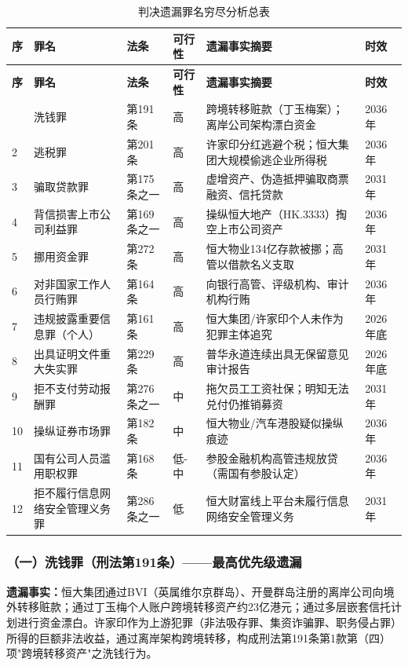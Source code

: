 \documentclass[11pt,a4paper,oneside,openany]{article}
\begin{document}
\begin{longtable}{p{0.4cm}p{2.5cm}p{1.4cm}p{1.1cm}p{5.2cm}p{1.5cm}}
\caption{判决遗漏罪名穷尽分析总表}\label{tab:omitted}\\
\toprule
\textbf{序} & \textbf{罪名} & \textbf{法条} & \textbf{可行性} & \textbf{遗漏事实摘要} & \textbf{时效} \\
\midrule
\endfirsthead
\toprule
\textbf{序} & \textbf{罪名} & \textbf{法条} & \textbf{可行性} & \textbf{遗漏事实摘要} & \textbf{时效} \\
\midrule
\endhead
\bottomrule
\endlastfoot
1 & 洗钱罪 & 第191条 & \cellcolor{rowalt}高 & 跨境转移赃款（丁玉梅案）；离岸公司架构漂白资金 & 2036年 \\
2 & 逃税罪 & 第201条 & \cellcolor{rowalt}高 & 许家印分红逃避个税；恒大集团大规模偷逃企业所得税 & 2036年 \\
3 & 骗取贷款罪 & 第175条之一 & \cellcolor{rowalt}高 & 虚增资产、伪造抵押骗取商票融资、信托贷款 & 2031年 \\
4 & 背信损害上市公司利益罪 & 第169条之一 & \cellcolor{rowalt}高 & 操纵恒大地产（HK.3333）掏空上市公司资产 & 2036年 \\
5 & 挪用资金罪 & 第272条 & \cellcolor{rowalt}高 & 恒大物业134亿存款被挪；高管以借款名义支取 & 2031年 \\
6 & 对非国家工作人员行贿罪 & 第164条 & \cellcolor{rowalt}高 & 向银行高管、评级机构、审计机构行贿 & 2036年 \\
7 & 违规披露重要信息罪（个人） & 第161条 & 高 & 恒大集团/许家印个人未作为犯罪主体追究 & \cellcolor{highrisk}2026年底 \\
8 & 出具证明文件重大失实罪 & 第229条 & 高 & 普华永道连续出具无保留意见审计报告 & \cellcolor{highrisk}2026年底 \\
9 & 拒不支付劳动报酬罪 & 第276条之一 & 中 & 拖欠员工工资社保；明知无法兑付仍推销募资 & 2031年 \\
10 & 操纵证券市场罪 & 第182条 & 中 & 恒大物业/汽车港股疑似操纵痕迹 & 2036年 \\
11 & 国有公司人员滥用职权罪 & 第168条 & 低-中 & 参股金融机构高管违规放贷（需国有参股认定） & 2036年 \\
12 & 拒不履行信息网络安全管理义务罪 & 第286条之一 & 低 & 恒大财富线上平台未履行信息网络安全管理义务 & 2031年 \\
\end{longtable}

\subsubsection{（一）洗钱罪（刑法第191条）——最高优先级遗漏}
\textbf{遗漏事实：}恒大集团通过BVI（英属维尔京群岛）、开曼群岛注册的离岸公司向境外转移赃款；通过丁玉梅个人账户跨境转移资产约23亿港元；通过多层嵌套信托计划进行资金漂白。许家印作为上游犯罪（非法吸存罪、集资诈骗罪、职务侵占罪）所得的巨额非法收益，通过离岸架构跨境转移，构成刑法第191条第1款第（四）项"跨境转移资产"之洗钱行为。
\end{document}
